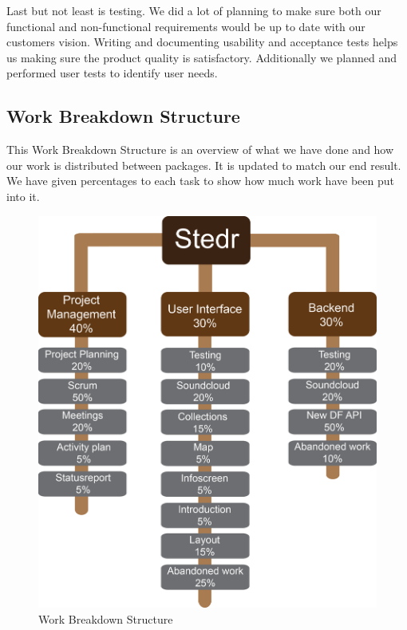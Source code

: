 Last but not least is testing. We did a lot of planning to make sure both our functional and non-functional requirements would be up to date with our customers vision. Writing and documenting usability and acceptance tests helps us making sure the product quality is satisfactory. Additionally we planned and performed user tests to identify user needs. 


\subsection{Work Breakdown Structure}
This Work Breakdown Structure is an overview of what we have done and how our work is distributed between packages. It is updated to match our end result.
We have given percentages to each task to show how much work have been put into it.

\begin{figure}[h!]
\begin{center}
\includegraphics[scale=0.6]{WBS}
\caption{Work Breakdown Structure}
\end{center}
\end{figure}
\clearpage




